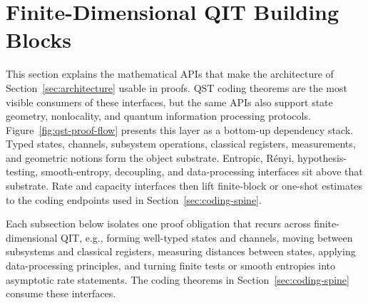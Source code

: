 \documentclass[10pt,a4paper]{article}
\begin{document}
\section{Finite-Dimensional QIT Building Blocks}
\label{sec:building-blocks}
	
This section explains the mathematical APIs that make the architecture of
Section~\ref{sec:architecture} usable in proofs. QST coding theorems are the most visible consumers of these interfaces, but the same APIs also support state geometry, nonlocality, and quantum information processing protocols. Figure~\ref{fig:qst-proof-flow} presents this layer as a bottom-up dependency stack. Typed states, channels, subsystem operations, classical registers, measurements, and geometric notions form the object substrate.  Entropic, R\'enyi, hypothesis-testing, smooth-entropy, decoupling, and data-processing interfaces sit above that substrate.  Rate and capacity interfaces then lift finite-block or one-shot estimates to the coding endpoints used in Section~\ref{sec:coding-spine}.

Each subsection below isolates one proof obligation that recurs across finite-dimensional QIT, e.g., forming well-typed states and channels, moving between subsystems and classical registers, measuring distances between states, applying data-processing principles, and turning finite tests or smooth entropies into asymptotic rate statements.  The coding theorems in Section~\ref{sec:coding-spine} consume these interfaces.
\end{document}
